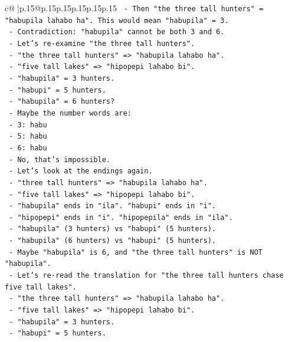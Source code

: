 \documentclass{article}
\begin{document}
{\begin{supertabular}{c@{$\;$}|p{.15\linewidth}@{}p{.15\linewidth}p{.15\linewidth}p{.15\linewidth}p{.15\linewidth}p{.15\linewidth}}
{{{\texttt{       {-} Then "the three tall hunters" = "habupila lahabo ha". This would mean "habupila" = 3.} \\
\texttt{       {-} Contradiction: "habupila" cannot be both 3 and 6.} \\
\texttt{       {-} Let's re{-}examine "the three tall hunters".} \\
\texttt{       {-} "the three tall hunters" => "habupila lahabo ha".} \\
\texttt{       {-} "five tall lakes" => "hipopepi lahabo bi".} \\
\texttt{       {-} "habupila" = 3 hunters.} \\
\texttt{       {-} "habupi" = 5 hunters.} \\
\texttt{       {-} "habupila" = 6 hunters?} \\
\texttt{       {-} Maybe the number words are:} \\
\texttt{         {-} 3: habu} \\
\texttt{         {-} 5: habu} \\
\texttt{         {-} 6: habu} \\
\texttt{       {-} No, that's impossible.} \\
\texttt{       {-} Let's look at the endings again.} \\
\texttt{       {-} "three tall hunters" => "habupila lahabo ha".} \\
\texttt{       {-} "five tall lakes" => "hipopepi lahabo bi".} \\
\texttt{       {-} "habupila" ends in "ila". "habupi" ends in "i".} \\
\texttt{       {-} "hipopepi" ends in "i". "hipopepila" ends in "ila".} \\
\texttt{       {-} "habupila" (3 hunters) vs "habupi" (5 hunters).} \\
\texttt{       {-} "habupila" (6 hunters) vs "habupi" (5 hunters).} \\
\texttt{       {-} Maybe "habupila" is 6, and "the three tall hunters" is NOT "habupila".} \\
\texttt{       {-} Let's re{-}read the translation for "the three tall hunters chase five tall lakes".} \\
\texttt{       {-} "the three tall hunters" => "habupila lahabo ha".} \\
\texttt{       {-} "five tall lakes" => "hipopepi lahabo bi".} \\
\texttt{       {-} "habupila" = 3 hunters.} \\
\texttt{       {-} "habupi" = 5 hunters.} \\
}}}
\end{supertabular}}
\end{document}
